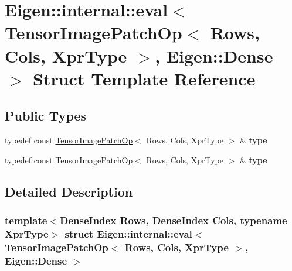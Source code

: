 \hypertarget{struct_eigen_1_1internal_1_1eval_3_01_tensor_image_patch_op_3_01_rows_00_01_cols_00_01_xpr_type_01_4_00_01_eigen_1_1_dense_01_4}{}\section{Eigen\+:\+:internal\+:\+:eval$<$ Tensor\+Image\+Patch\+Op$<$ Rows, Cols, Xpr\+Type $>$, Eigen\+:\+:Dense $>$ Struct Template Reference}
\label{struct_eigen_1_1internal_1_1eval_3_01_tensor_image_patch_op_3_01_rows_00_01_cols_00_01_xpr_type_01_4_00_01_eigen_1_1_dense_01_4}
\subsection*{Public Types}
\begin{DoxyCompactItemize}
\item 
\mbox{\label{struct_eigen_1_1internal_1_1eval_3_01_tensor_image_patch_op_3_01_rows_00_01_cols_00_01_xpr_type_01_4_00_01_eigen_1_1_dense_01_4_aaf8010f4cd7b811c2ba9d2bd32ee630e}} 
typedef const \hyperlink{class_eigen_1_1_tensor_image_patch_op}{Tensor\+Image\+Patch\+Op}$<$ Rows, Cols, Xpr\+Type $>$ \& {\bfseries type}
\item 
\mbox{\label{struct_eigen_1_1internal_1_1eval_3_01_tensor_image_patch_op_3_01_rows_00_01_cols_00_01_xpr_type_01_4_00_01_eigen_1_1_dense_01_4_aaf8010f4cd7b811c2ba9d2bd32ee630e}} 
typedef const \hyperlink{class_eigen_1_1_tensor_image_patch_op}{Tensor\+Image\+Patch\+Op}$<$ Rows, Cols, Xpr\+Type $>$ \& {\bfseries type}
\end{DoxyCompactItemize}


\subsection{Detailed Description}
\subsubsection*{template$<$Dense\+Index Rows, Dense\+Index Cols, typename Xpr\+Type$>$\newline
struct Eigen\+::internal\+::eval$<$ Tensor\+Image\+Patch\+Op$<$ Rows, Cols, Xpr\+Type $>$, Eigen\+::\+Dense $>$}



